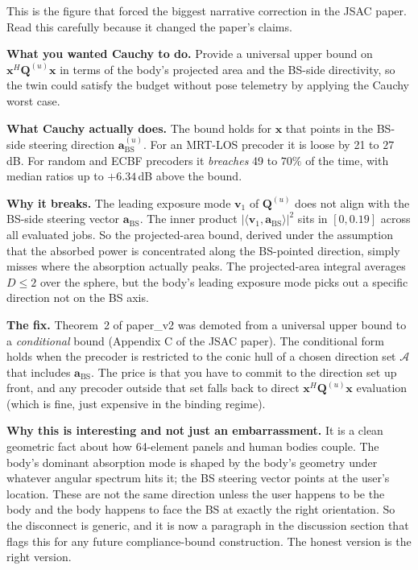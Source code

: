 \documentclass[11pt]{article}
\newcommand{\xx}{\mathbf{x}}
\newcommand{\Qmat}{\mathbf{Q}}
\begin{document}
This is the figure that forced the biggest narrative correction in the
JSAC paper. Read this carefully because it changed the paper's claims.

\textbf{What you wanted Cauchy to do.} Provide a universal upper bound
on $\xx^H \Qmat^{(u)} \xx$ in terms of the body's projected area and
the BS-side directivity, so the twin could satisfy the budget without
pose telemetry by applying the Cauchy worst case.

\textbf{What Cauchy actually does.} The bound holds for $\xx$ that
points in the BS-side steering direction $\mathbf{a}_{\mathrm{BS}}^{(u)}$.
For an MRT-LOS precoder it is loose by 21 to $27\,$dB. For random and
ECBF precoders it \emph{breaches} 49 to $70\%$ of the time, with
median ratios up to $+6.34\,$dB above the bound.

\textbf{Why it breaks.} The leading exposure mode $\mathbf{v}_1$ of
$\Qmat^{(u)}$ does not align with the BS-side steering vector
$\mathbf{a}_{\mathrm{BS}}$. The inner product
$|\langle \mathbf{v}_1, \mathbf{a}_{\mathrm{BS}}\rangle|^2$ sits in
$[0, 0.19]$ across all evaluated jobs. So the projected-area bound,
derived under the assumption that the absorbed power is concentrated
along the BS-pointed direction, simply misses where the absorption
actually peaks. The projected-area integral averages $D \leq 2$ over
the sphere, but the body's leading exposure mode picks out a specific
direction not on the BS axis.

\textbf{The fix.} Theorem~2 of paper\_v2 was demoted from a universal
upper bound to a \emph{conditional} bound (Appendix C of the JSAC
paper). The conditional form holds when the precoder is restricted to
the conic hull of a chosen direction set $\mathcal{A}$ that includes
$\mathbf{a}_{\mathrm{BS}}$. The price is that you have to commit to
the direction set up front, and any precoder outside that set falls
back to direct $\xx^H \Qmat^{(u)} \xx$ evaluation (which is fine,
just expensive in the binding regime).

\textbf{Why this is interesting and not just an embarrassment.} It is
a clean geometric fact about how 64-element panels and human bodies
couple. The body's dominant absorption mode is shaped by the body's
geometry under whatever angular spectrum hits it; the BS steering
vector points at the user's location. These are not the same direction
unless the user happens to be the body and the body happens to face
the BS at exactly the right orientation. So the disconnect is
generic, and it is now a paragraph in the discussion section that
flags this for any future compliance-bound construction. The honest
version is the right version.
\end{document}
